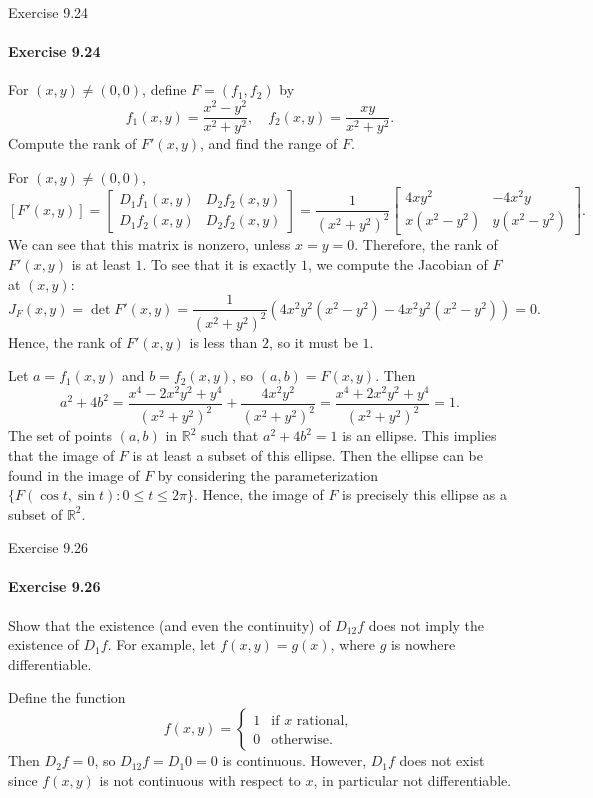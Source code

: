 \documentclass[12pt]{article}
\newenvironment{fullbox}{\begin{lrbox}{\savefullbox}\begin{minipage}{\dimexpr\textwidth-2\fboxsep\relax}}{\end{minipage}\end{lrbox}\begin{center}\framebox[\textwidth]{\usebox{\savefullbox}}\end{center}}
\newenvironment{pbox}[1][]{\begin{fullbox}\ifx#1\empty\else\paragraph{#1}\fi}{\end{fullbox}}
\theoremstyle{definition}
\newcommand{\R}{\mathbb{R}}
\newcommand{\mat}[1]{\begin{bmatrix}#1\end{bmatrix}}
\begin{document}
\thispagestyle{title}




\begin{pbox}[Exercise 9.24]
    For $(x, y) \ne (0, 0)$, define $F = (f_1, f_2)$ by 
    \[
        f_1(x, y) = \frac{x^2 - y^2}{x^2 + y^2}, \quad f_2(x, y) = \frac{xy}{x^2 + y^2}.
    \]
    Compute the rank of $F'(x, y)$, and find the range of $F$.
\end{pbox}

For $(x, y) \ne (0, 0)$,
\[
    [F'(x, y)] 
        = \mat{D_1f_1(x, y) & D_2f_2(x, y) \\ D_1f_2(x, y) & D_2f_2(x, y)}
        = \frac{1}{(x^2 + y^2)^2}\mat{4xy^2 & -4x^2y \\ x(x^2 - y^2) & y(x^2 - y^2)}.
\]
We can see that this matrix is nonzero, unless $x = y = 0$. Therefore, the rank of $F'(x, y)$ is at least $1$. To see that it is exactly $1$, we compute the Jacobian of $F$ at $(x, y)$:
\[
    J_F(x, y)
        = \det F'(x, y)
        = \frac{1}{(x^2 + y^2)^2}\left(4x^2y^2(x^2 - y^2) - 4x^2y^2(x^2 - y^2)\right)
        = 0.
\]
Hence, the rank of $F'(x, y)$ is less than $2$, so it must be $1$.

Let $a = f_1(x, y)$ and $b = f_2(x, y)$, so $(a, b) = F(x, y)$. Then
\[
    a^2 + 4b^2
        = \frac{x^4 -2x^2y^2 + y^4}{(x^2 + y^2)^2} + \frac{4x^2y^2}{(x^2 + y^2)^2}
        = \frac{x^4 + 2x^2y^2 + y^4}{(x^2 + y^2)^2}
        = 1.
\]
The set of points $(a, b)$ in $\R^2$ such that $a^2 + 4b^2 = 1$ is an ellipse. This implies that the image of $F$ is at least a subset of this ellipse. Then the ellipse can be found in the image of $F$ by considering the parameterization $\{F(\cos t, \sin t) : 0 \leq t \leq 2\pi\}$. Hence, the image of $F$ is precisely this ellipse as a subset of $\R^2$.



\begin{pbox}[Exercise 9.26]
    Show that the existence (and even the continuity) of $D_{12}f$ does not imply the existence of $D_1f$. For example, let $f(x, y) = g(x)$, where $g$ is nowhere differentiable.
\end{pbox}

Define the function
\[
    f(x, y) = \begin{cases}
        1 &\text{if $x$ rational}, \\
        0 &\text{otherwise}.
    \end{cases}
\]
Then $D_2f = 0$, so $D_{12}f = D_1 0 = 0$ is continuous. However, $D_1f$ does not exist since $f(x, y)$ is not continuous with respect to $x$, in particular not differentiable.
\end{document}
